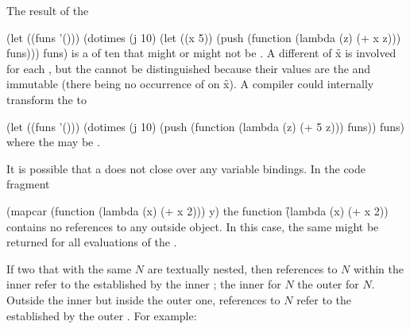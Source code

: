 The result of the 
 
\code
 (let ((funs '()))
   (dotimes (j 10)
     (let ((x 5))
       (push (function (lambda (z) (+ x z)))
            funs)))
   funs)
\endcode
is a  of ten   that
might or might not be .
A different  of \f{x} is involved for
each , but the  cannot be distinguished
because their values are the  and immutable (there being no occurrence
of  on \f{x}).  A compiler could internally
transform the  to
 
\code
 (let ((funs '()))
   (dotimes (j 10)
     (push (function (lambda (z) (+ 5 z)))
           funs))
  funs)
\endcode
where the  may be .
 
It is possible that a  does not
close over any variable bindings.
In the code fragment
 
\code
 (mapcar (function (lambda (x) (+ x 2))) y)
\endcode
the function \f{(lambda (x) (+ x 2))} contains no references to any outside
object. In this case, the same  might be returned
for all evaluations of the  .

\endSubsection%
 
%
%

If two  that   with
the same  $N$ are textually nested, then references to $N$
within the inner  refer to the  established by
the inner ; the inner  for $N$
 the outer  for $N$.  Outside the inner
 but inside the outer one, references to $N$ refer to the
 established by the outer .  For example:

